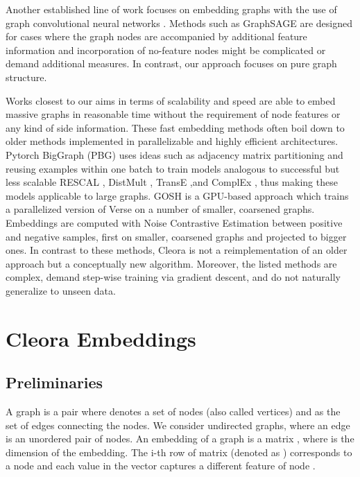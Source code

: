 \documentclass{IEEEtran}
\begin{document}
Another established line of work focuses on embedding graphs with the use of graph  convolutional neural networks \cite{Kipf:2016tc}. Methods such as 
GraphSAGE \cite{NIPS2017_6703} are designed for cases where the graph nodes are accompanied by additional feature information and incorporation of no-feature nodes might be complicated or demand additional measures. In contrast, our approach focuses on pure graph structure. 

Works closest to our aims in terms of scalability and speed are able to embed massive graphs in reasonable time without the requirement of node features or any kind of side information. These fast embedding methods often boil down to older methods implemented in parallelizable and highly efficient architectures. Pytorch BigGraph (PBG) \cite{pbg} uses ideas such as adjacency matrix partitioning and reusing examples within one batch to train models analogous to successful but less scalable RESCAL \cite{10.5555/3104482.3104584}, DistMult \cite{yang2014embedding}, TransE \cite{bordes2013translating},and ComplEx \cite{trouillon2016complex}, thus making these models applicable to large graphs. GOSH \cite{10.1145/3404397.3404456} is a GPU-based approach which trains a parallelized version of Verse \cite{verse} on a number of smaller, coarsened graphs. Embeddings are computed with Noise Contrastive Estimation between positive and negative samples, first on smaller, coarsened graphs and projected to bigger ones. In contrast to these methods, Cleora is not a reimplementation of an older approach but a conceptually new algorithm. Moreover, the listed methods are complex, demand step-wise training via gradient descent, and do not naturally generalize to unseen data.

\section{Cleora Embeddings}

\subsection{Preliminaries} A graph  is a pair  where  denotes a set of nodes (also called vertices) and  as the set of edges connecting the nodes. We consider undirected graphs, where an edge is an unordered pair of nodes. An embedding of a graph  is a  matrix , where  is the dimension of the embedding. The i-th row of matrix  (denoted as ) corresponds to a node   and each value  in the vector  captures a different feature of node .
\end{document}
